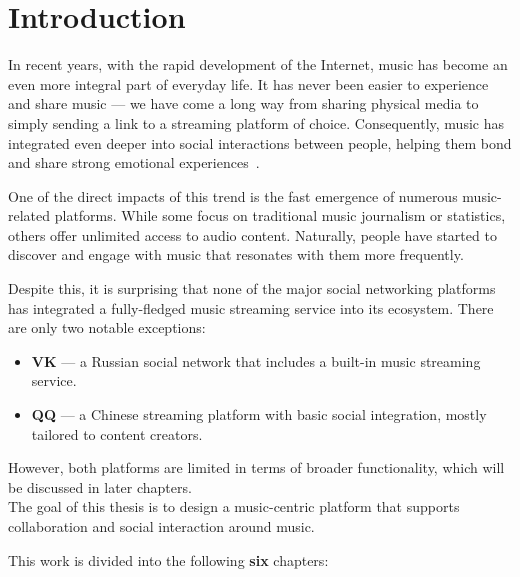 \chapter{Introduction}

In recent years, with the rapid development of the Internet,
music has become an even more integral part of everyday life.\cite{music_role_life}
It has never been easier to experience and share music — we have come
a long way from sharing physical media to simply sending a link to a streaming platform of choice.
Consequently, music has integrated even deeper into social interactions between people,
helping them bond and share strong emotional experiences~\cite{music_role_life}.

One of the direct impacts of this trend is the fast emergence of numerous music-related platforms.
While some focus on traditional music journalism or statistics, others offer unlimited access to audio content.
Naturally, people have started to discover and engage with music that resonates with them more frequently.

Despite this, it is surprising that none of the major social networking platforms has integrated
a fully-fledged music streaming service into its ecosystem.
There are only two notable exceptions:

\begin{itemize}
    \item \textbf{VK} — a Russian social network that includes a built-in music streaming service.
    \item \textbf{QQ} — a Chinese streaming platform with basic social integration, mostly tailored to content creators.
\end{itemize}

However, both platforms are limited in terms of broader functionality, which will be discussed in later chapters.\\

The goal of this thesis is to design a music-centric platform that supports
collaboration and social interaction around music.

This work is divided into the following \textbf{six} chapters:

